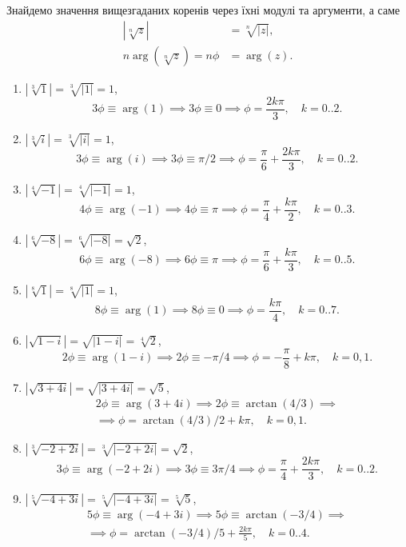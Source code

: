 \begin{solution}
	Знайдемо значення вищезгаданих коренів через їхні модулі та аргументи, а саме
	\begin{align}
		\label{eq:1.2}
		\left|\sqrt[n]{z}\right|&=\sqrt[n]{|z|},\\
		n\arg\left(\sqrt[n]{z}\right)=n\phi&=\arg(z).
	\end{align}
	\begin{enumerate}
		\item $\left|\sqrt[3]{1}\right| = \sqrt[3]{|1|} = 1$,
		\[3\phi\equiv\arg(1)\implies3\phi\equiv0\implies\phi=\frac{2k\pi}{3},\quad k=0..2.\]
		\item $\left|\sqrt[3]{i}\right| = \sqrt[3]{|i|} = 1$,
		\[3\phi\equiv\arg(i)\implies3\phi\equiv\pi/2\implies\phi=\frac{\pi}{6}+\frac{2k\pi}{3},\quad k=0..2.\]
		\item $\left|\sqrt[4]{-1}\right| = \sqrt[4]{|-1|} = 1$,
		\[4\phi\equiv\arg(-1)\implies4\phi\equiv\pi\implies\phi=\frac{\pi}{4}+\frac{k\pi}{2},\quad k=0..3.\]
		\item $\left|\sqrt[6]{-8}\right| = \sqrt[6]{|-8|} = \sqrt{2}$,
		\[6\phi\equiv\arg(-8)\implies6\phi\equiv\pi\implies\phi=\frac{\pi}{6}+\frac{k\pi}{3},\quad k=0..5.\]
		\item $\left|\sqrt[8]{1}\right| = \sqrt[8]{|1|} = 1$,
		\[8\phi\equiv\arg(1)\implies8\phi\equiv0\implies\phi=\frac{k\pi}{4},\quad k=0..7.\]
		\item $\left|\sqrt{1-i}\right| = \sqrt{|1-i|} = \sqrt[4]{2}$,
		\[2\phi\equiv\arg(1-i)\implies2\phi\equiv-\pi/4\implies\phi=-\frac{\pi}{8}+k\pi,\quad k=0,1.\]
		\item $\left|\sqrt{3+4i}\right| = \sqrt{|3+4i|} = \sqrt{5}$,
		\begin{multline*}2\phi\equiv\arg(3+4i)\implies2\phi\equiv\arctan(4/3)\implies\\\implies\phi=\arctan(4/3)/2+k\pi,\quad k=0,1.\end{multline*}
		\item $\left|\sqrt[3]{-2+2i}\right| = \sqrt[3]{|-2+2i|} = \sqrt{2}$,
		\[3\phi\equiv\arg(-2+2i)\implies3\phi\equiv3\pi/4\implies\phi=\frac{\pi}{4}+\frac{2k\pi}{3},\quad k=0..2.\]
		\item $\left|\sqrt[5]{-4+3i}\right| = \sqrt[5]{|-4+3i|} = \sqrt[5]{5}$,
		\begin{multline*}5\phi\equiv\arg(-4+3i)\implies5\phi\equiv\arctan(-3/4)\implies\\\implies\phi=\arctan(-3/4)/5+\frac{2k\pi}{5},\quad k=0..4.\end{multline*}
	\end{enumerate}
\end{solution}

